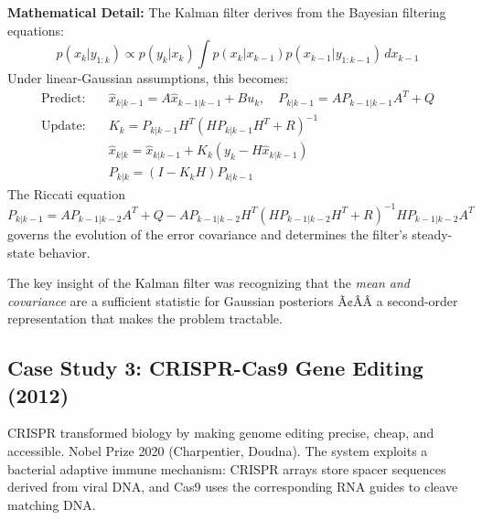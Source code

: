 \textbf{Mathematical Detail:} The Kalman filter derives from the Bayesian filtering equations:
\[
p(x_k | y_{1:k}) \propto p(y_k | x_k) \int p(x_k | x_{k-1}) p(x_{k-1} | y_{1:k-1}) \, dx_{k-1}
\]
Under linear-Gaussian assumptions, this becomes:
\begin{align*}
\text{Predict:}\quad & \hat{x}_{k|k-1} = A\hat{x}_{k-1|k-1} + Bu_k, \quad P_{k|k-1} = AP_{k-1|k-1}A^T + Q \\
\text{Update:}\quad & K_k = P_{k|k-1}H^T(HP_{k|k-1}H^T + R)^{-1} \\
& \hat{x}_{k|k} = \hat{x}_{k|k-1} + K_k(y_k - H\hat{x}_{k|k-1}) \\
& P_{k|k} = (I - K_kH)P_{k|k-1}
\end{align*}
The Riccati equation $P_{k|k-1} = A P_{k-1|k-2} A^T + Q - A P_{k-1|k-2} H^T (H P_{k-1|k-2} H^T + R)^{-1} H P_{k-1|k-2} A^T$ governs the evolution of the error covariance and determines the filter's steady-state behavior.

\begin{mentalLeap}The key insight of the Kalman filter was recognizing that the \emph{mean and covariance} are a sufficient statistic for Gaussian posteriors Ã¢ÂÂ a second-order representation that makes the problem tractable.\end{mentalLeap}

\subsection{Case Study 3: CRISPR-Cas9 Gene Editing (2012)}

CRISPR transformed biology by making genome editing precise, cheap, and accessible. Nobel Prize 2020 (Charpentier, Doudna). The system exploits a bacterial adaptive immune mechanism: CRISPR arrays store spacer sequences derived from viral DNA, and Cas9 uses the corresponding RNA guides to cleave matching DNA.

